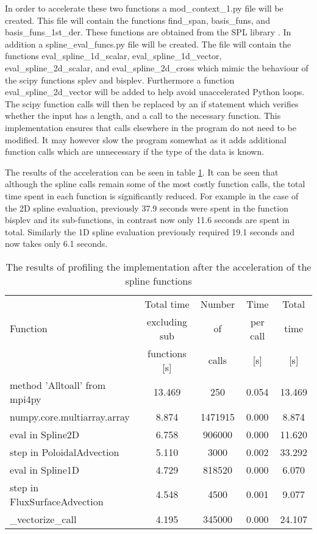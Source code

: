 In order to accelerate these two functions a mod\_context\_1.py file will be created. This file will contain the functions find\_span, basis\_funs, and basis\_funs\_1st\_der. These functions are obtained from the SPL library \cite{Python SPL}.  In addition a spline\_eval\_funcs.py file will be created. The file will contain the functions eval\_spline\_1d\_scalar, eval\_spline\_1d\_vector, eval\_spline\_2d\_scalar, and eval\_spline\_2d\_cross which mimic the behaviour of the scipy functions splev and bisplev. Furthermore a function eval\_spline\_2d\_vector will be added to help avoid unaccelerated Python loops. The scipy function calls will then be replaced by an if statement which verifies whether the input has a length, and a call to the necessary function. This implementation ensures that calls elsewhere in the program do not need to be modified. It may however slow the program somewhat as it adds additional function calls which are unnecessary if the type of the data is known.

The results of the acceleration can be seen in table \ref{tab::spline profile}. It can be seen that although the spline calls remain some of the most costly function calls, the total time spent in each function is significantly reduced. For example in the case of the 2D spline evaluation, previously 37.9 seconds were spent in the function bisplev and its sub-functions, in contrast now only 11.6 seconds are spent in total. Similarly the 1D spline evaluation previously required 19.1 seconds and now takes only 6.1 seconds.

\begin{table}[ht]
\centering
 \begin{tabular}{|m{}|c|c|c|c|}
  \hline
          & Total time & Number & Time & Total \\
  Function & excluding sub & of & per call & time \\
          & functions [s] & calls & [s] & [s] \\
  \hline
  \hline
  method 'Alltoall' from mpi4py & 13.469 & 250 & 0.054 & 13.469 \\
  \hline
  numpy.core.multiarray.array & 8.874 & 1471915 & 0.000 & 8.874 \\
  \hline
  eval in Spline2D & 6.758 & 906000 & 0.000 & 11.620\\
  \hline
  step in PoloidalAdvection & 5.110 & 3000 & 0.002 & 33.292\\
  \hline
  eval in Spline1D & 4.729 & 818520 & 0.000 & 6.070\\
  \hline
  step in FluxSurfaceAdvection & 4.548 & 4500 & 0.001 & 9.077\\
  \hline
  \_vectorize\_call & 4.195 & 345000 & 0.000 & 24.107\\
  \hline
 \end{tabular}
 \caption{\label{tab::spline profile} The results of profiling the implementation after the acceleration of the spline functions}
\end{table}

